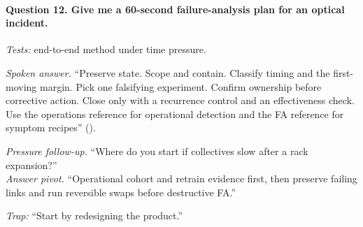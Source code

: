\paragraph{Question 12. Give me a 60-second failure-analysis plan for an optical
incident.}
\textit{Tests:} end-to-end method under time pressure.

\textit{Spoken answer.}
``Preserve state. Scope and contain. Classify timing and the first-moving
margin. Pick one falsifying experiment. Confirm ownership before corrective
action. Close only with a recurrence control and an effectiveness check. Use
the operations reference for operational detection and the FA reference for symptom recipes''
().

\textit{Pressure follow-up.} ``Where do you start if collectives slow after a
rack expansion?''\\
\textit{Answer pivot.} ``Operational cohort and retrain evidence first, then
preserve failing links and run reversible swaps before destructive FA.''

\textit{Trap:} ``Start by redesigning the product.''
